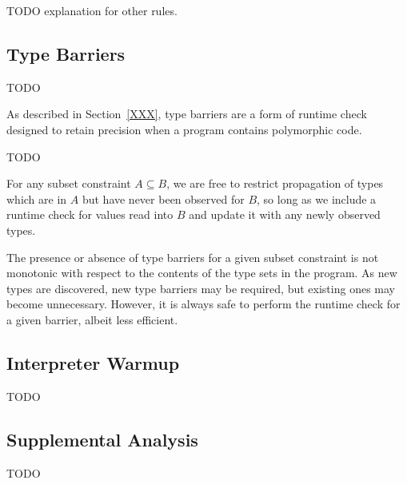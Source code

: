 TODO explanation for other rules.

\subsection{Type Barriers}

TODO

As described in Section~\ref{XXX}, type barriers are a form of runtime
check designed to retain precision when a program contains polymorphic code.

TODO

For any subset constraint $A \subseteq B$, we are free to restrict
propagation of types which are in $A$ but have never been observed for $B$,
so long as we include a runtime check for values read into $B$ and update
it with any newly observed types.

The presence or absence of type barriers for a given subset constraint
is not monotonic with respect to the contents of the type sets in the program.
As new types are discovered, new type barriers may be required, but existing
ones may become unnecessary.
However, it is always safe to perform the runtime check for a given barrier,
albeit less efficient.

\subsection{Interpreter Warmup}

TODO

\subsection{Supplemental Analysis}

TODO

